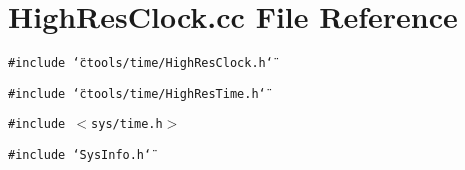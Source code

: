 \section{High\-Res\-Clock.cc File Reference}
\label{HighResClock_8cc}
{\tt \#include \char`\"{}ctools/time/High\-Res\-Clock.h\char`\"{}}\par
{\tt \#include \char`\"{}ctools/time/High\-Res\-Time.h\char`\"{}}\par
{\tt \#include $<$sys/time.h$>$}\par
{\tt \#include \char`\"{}Sys\-Info.h\char`\"{}}\par
